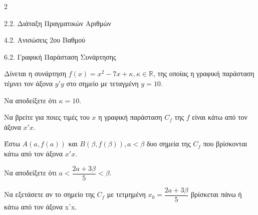 \begin{ylh}{2}
    \item 2.2. Διάταξη Πραγματικών Αριθμών
    \item 4.2. Ανισώσεις 2ου Βαθμού
    \item 6.2. Γραφική Παράσταση Συνάρτησης
\end{ylh}
Δίνεται η συνάρτηση $f(x) = x^2 - 7x + \kappa, \kappa \in \mathbb{R}$, της οποίας η γραφική παράσταση τέμνει τον άξονα $y'y$ στο σημείο με τεταγμένη $y = 10$.

\begin{alist}
\item Να αποδείξετε ότι $\kappa = 10$. 
\item Να βρείτε για ποιες τιμές του $x$ η γραφική παράσταση $C_f$ της $f$ είναι κάτω από τον άξονα $x'x$. 
\item Έστω $A(a, f(a))$ και $B(\beta, f(\beta)), a < \beta$ δυο σημεία της $C_f$ που βρίσκονται κάτω από τον άξονα $x'x$.

\begin{rlist}
\item Να αποδείξετε ότι $a < \dfrac{2a+3\beta}{5} < \beta$.
\item Να εξετάσετε αν το σημείο της $C_f$ με τετμημένη $x_0 = \dfrac{2a+3\beta}{5}$ βρίσκεται πάνω ή κάτω από τον άξονα x΄x.
\end{rlist}
\end{alist}

